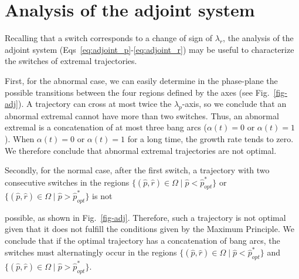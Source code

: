 \documentclass[a4paper,12pt]{article}
\newcommand{\tr}[1]{{#1}}
\begin{document}
\tr{\section{Analysis of the adjoint system}
Recalling that a switch corresponds to a change of sign of $\lambda_r$, the analysis of the adjoint system (\tr{Eqs~\ref{eq:adjoint_p}-\ref{eq:adjoint_r}}) may be useful to characterize the switches of extremal trajectories. 

First, \tr{for the abnormal case, we can easily determine in the phase-plane the possible transitions between the four regions defined by the axes (see Fig.~\ref{fig-adj}). A trajectory can cross at most twice the $\lambda_p$-axis, so}  we conclude that an abnormal extremal cannot have more than two switches. Thus, an abnormal extremal is a concatenation of at most three bang arcs ($\alpha(t)=0$ or $\alpha(t)=1$). When  $\alpha(t)=0$ or $\alpha(t)=1$ for a long time, the growth rate tends to zero. We therefore conclude that  abnormal extremal trajectories are not optimal.

Secondly, for the normal case, after the first switch, a trajectory with two consecutive switches in the regions $\{(\hat{p},\hat{r})\in \Omega \mid \hat{p}<\hat{p}_{opt}^*\}$ or $\{(\hat{p},\hat{r})\in \Omega \mid \hat{p}>\hat{p}_{opt}^*\}$ is not} \tr{possible, as shown in Fig.~\ref{fig-adj}. Therefore, such a trajectory is not optimal given that it does not fulfill the conditions given by the Maximum Principle.
We conclude that if the optimal trajectory has a concatenation of bang arcs, the switches must alternatingly occur in the regions  $\{(\hat{p},\hat{r})\in \Omega \mid \hat{p}<\hat{p}_{opt}^*\}$ and $\{(\hat{p},\hat{r})\in \Omega \mid \hat{p}>\hat{p}_{opt}^*\}$.}
\end{document}
